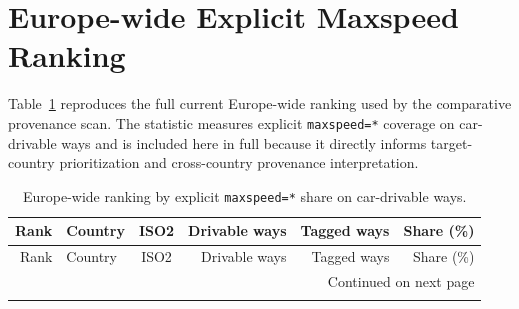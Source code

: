 \documentclass{article}
\begin{document}
\section{Europe-wide Explicit Maxspeed Ranking}
Table~\ref{tab:europe_full_ranking} reproduces the full current Europe-wide ranking used by the comparative provenance scan. The statistic measures explicit \texttt{maxspeed=*} coverage on car-drivable ways and is included here in full because it directly informs target-country prioritization and cross-country provenance interpretation.

{\scriptsize
\begin{longtable}{@{}r p{4.1cm} c r r r@{}}
\caption{Europe-wide ranking by explicit \texttt{maxspeed=*} share on car-drivable ways.}
\label{tab:europe_full_ranking}\\
\toprule
Rank & Country & ISO2 & Drivable ways & Tagged ways & Share (\%) \\
\midrule
\endfirsthead
\toprule
Rank & Country & ISO2 & Drivable ways & Tagged ways & Share (\%) \\
\midrule
\endhead
\midrule
\multicolumn{6}{r}{Continued on next page} \\
\midrule
\endfoot
\bottomrule
\endlastfoot

\end{longtable}
}



\end{document}

